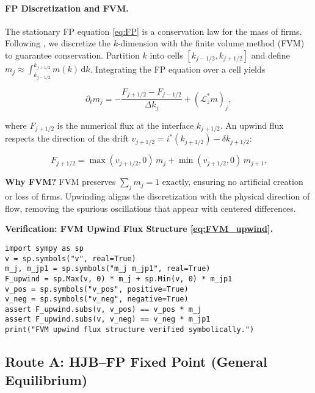 \documentclass[11pt,letterpaper,oneside]{article}
\providecommand{\ac}[1]{#1}%
\newcommand{\Lzadj}{\mathcal{L}_z^{*}}
\begin{document}
\paragraph{FP Discretization and FVM.} The stationary FP equation \eqref{eq:FP} is a conservation law for the mass of firms. Following \cite{chen_huang_2025_controls}, we discretize the $k$-dimension with the finite volume method (FVM) to guarantee conservation. Partition $k$ into cells $[k_{j-1/2}, k_{j+1/2}]$ and define $m_j \approx \int_{k_{j-1/2}}^{k_{j+1/2}} m(k)\,\mathrm{d}k$. Integrating the FP equation over a cell yields

\begin{equation}\label{eq:FVM}
\partial_t m_j = - \frac{F_{j+1/2} - F_{j-1/2}}{\Delta k_j} + (\Lzadj m)_j,
\end{equation}

where $F_{j+1/2}$ is the numerical flux at the interface $k_{j+1/2}$. An upwind flux respects the direction of the drift $v_{j+1/2} = i^*(k_{j+1/2}) - \delta k_{j+1/2}$:

\begin{equation}\label{eq:FVM_upwind}
F_{j+1/2} = \max(v_{j+1/2}, 0)\, m_j + \min(v_{j+1/2}, 0)\, m_{j+1}.
\end{equation}

\begin{tcolorbox}[didacticstyle]
\textbf{Why FVM?} FVM preserves $\sum_j m_j = 1$ exactly, ensuring no artificial creation or loss of firms. Upwinding aligns the discretization with the physical direction of flow, removing the spurious oscillations that appear with centered differences.
\end{tcolorbox}

\begin{tcolorbox}[sympycheckstyle]
\textbf{Verification: FVM Upwind Flux Structure \eqref{eq:FVM_upwind}.}
\begin{verbatim}
import sympy as sp
v = sp.symbols("v", real=True)
m_j, m_jp1 = sp.symbols("m_j m_jp1", real=True)
F_upwind = sp.Max(v, 0) * m_j + sp.Min(v, 0) * m_jp1
v_pos = sp.symbols("v_pos", positive=True)
v_neg = sp.symbols("v_neg", negative=True)
assert F_upwind.subs(v, v_pos) == v_pos * m_j
assert F_upwind.subs(v, v_neg) == v_neg * m_jp1
print("FVM upwind flux structure verified symbolically.")
\end{verbatim}
\end{tcolorbox}

\subsection{Route A: \ac{HJB}--\ac{FP} Fixed Point (General Equilibrium)}\label{sec:routeA}
\end{document}
